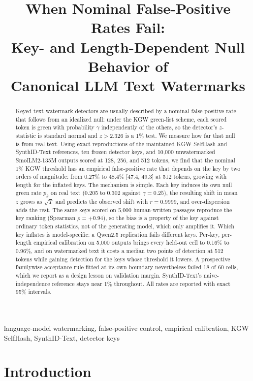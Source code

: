 \documentclass[conference]{IEEEtran}
\title{When Nominal False-Positive Rates Fail:\\
Key- and Length-Dependent Null Behavior of\\
Canonical LLM Text Watermarks}
\author{\IEEEauthorblockN{Nisaharan Genhatharan}
\IEEEauthorblockA{\textit{UNSW Sydney}\\
Sydney, Australia}}
\begin{document}
\maketitle

\begin{abstract}
Keyed text-watermark detectors are usually described by a nominal false-positive
rate that follows from an idealized null: under the KGW green-list scheme, each
scored token is green with probability $\gamma$ independently of the others, so
the detector's $z$-statistic is standard normal and $z>2.326$ is a 1\% test. We
measure how far that null is from real text. Using exact reproductions of the
maintained KGW SelfHash and SynthID-Text references, ten frozen detector keys, and
10,000 unwatermarked SmolLM2-135M outputs scored at 128, 256, and 512 tokens, we
find that the nominal 1\% KGW threshold has an empirical false-positive rate that
depends on the key by two orders of magnitude: from 0.27\% to 48.4\% [47.4, 49.3]
at 512 tokens, growing with length for the inflated keys. The mechanism is simple.
Each key induces its own null green rate $p_k$ on real text (0.205 to 0.302 against
$\gamma=0.25$), the resulting shift in mean $z$ grows as $\sqrt{T}$ and predicts
the observed shift with $r=0.9999$, and over-dispersion adds the rest. The same
keys scored on 5,000 human-written passages reproduce the key ranking
(Spearman $\rho=+0.94$), so the bias is a property of the key against ordinary
token statistics, not of the generating model, which only amplifies it. Which key
inflates is model-specific: a Qwen2.5 replication fails different keys. Per-key,
per-length empirical calibration on 5,000 outputs brings every held-out cell to
0.16\% to 0.96\%, and on watermarked text it costs a median two points of
detection at 512 tokens while gaining detection for the keys whose threshold it
lowers. A prospective familywise acceptance rule fitted at its own
boundary nevertheless failed 18 of 60 cells, which we report as a design lesson on
validation margin. SynthID-Text's naive-independence reference stays near 1\%
throughout. All rates are reported with exact 95\% intervals.
\end{abstract}

\begin{IEEEkeywords}
language-model watermarking, false-positive control, empirical calibration,
KGW SelfHash, SynthID-Text, detector keys
\end{IEEEkeywords}

\section{Introduction}
\end{document}
